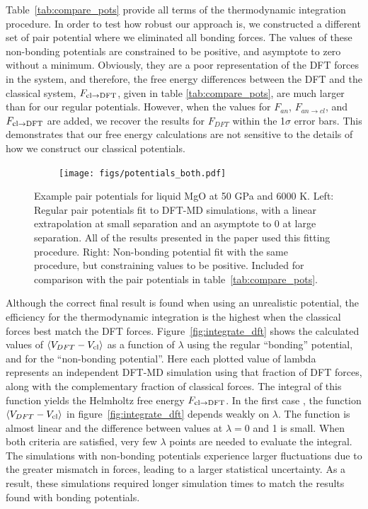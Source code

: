 Table~\ref{tab:compare_pots} provide all terms of the thermodynamic integration
procedure. In order to test how robust our approach is, we constructed a different
set of pair potential where we eliminated all bonding forces. The values of these
non-bonding potentials are constrained to be positive, and asymptote to zero without
a minimum. Obviously, they are a poor representation of the DFT forces in the
system,
and therefore, the free energy differences between the DFT and the classical system,
$F_{\rm cl \to DFT}$, given in table \ref{tab:compare_pots}, are much larger than for
our regular potentials.  However, when the values for $F_{an}$, $F_{an \to cl}$, and
$F_{\rm cl \to DFT}$ are added, we recover the results for $F_{DFT}$ within the
1$\sigma$ error bars. This demonstrates that our free energy calculations are not
sensitive to the details of how we construct our classical potentials.

\begin{figure}[h!]  
    \centering
    \texttt{[image: figs/potentials\_both.pdf]}
\caption{Example pair potentials for liquid MgO at 50 GPa and 6000 K. Left: 
  Regular pair potentials fit to DFT-MD simulations, with a linear
  extrapolation at small separation and an asymptote to 0 at large
  separation.  All of the results presented in the paper used this fitting
  procedure. Right: Non-bonding potential fit with the same procedure, but
  constraining values to be positive. Included for comparison with the pair
  potentials in table~\ref{tab:compare_pots}.}
\label{fig:potentials}
\end{figure}


Although the correct final result is found when using an unrealistic
potential, the efficiency for the thermodynamic integration is the highest
when the classical forces best match the DFT forces.
Figure~\ref{fig:integrate_dft} shows the calculated values of $\left<
V_{DFT} - V_{\rm cl} \right>$ as a function of $\lambda$ using the regular
``bonding'' potential, and for the ``non-bonding potential''. Here each
plotted value of lambda represents an independent DFT-MD simulation 
using that fraction of DFT forces, along with the complementary fraction of
classical forces. The integral of this function yields the Helmholtz free
energy $F_{\rm cl \to DFT}$. In the first case , the function $\left<
V_{DFT}-V_{\rm cl}\right>$ in figure~\ref{fig:integrate_dft} depends weakly
on $\lambda$. The function is almost linear and the difference between
values at $\lambda=0$ and 1 is small. When both criteria are satisfied,
very few $\lambda$ points are needed to evaluate the integral. The
simulations with non-bonding potentials experience larger fluctuations  due
to the greater mismatch in forces, leading to a larger statistical
uncertainty.  As a result, these simulations required longer simulation
times to match the results found with bonding potentials.

